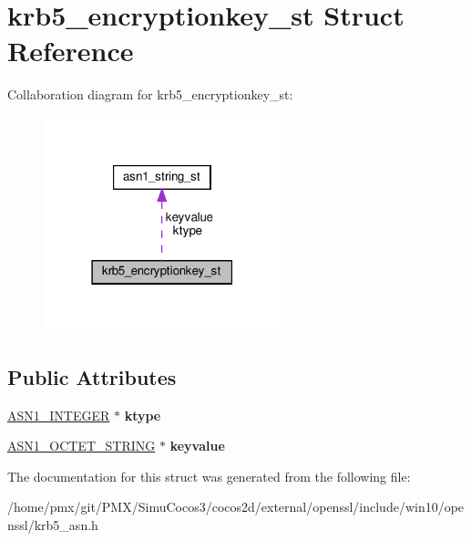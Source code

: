 \hypertarget{structkrb5__encryptionkey__st}{}\section{krb5\+\_\+encryptionkey\+\_\+st Struct Reference}
\label{structkrb5__encryptionkey__st}


Collaboration diagram for krb5\+\_\+encryptionkey\+\_\+st\+:
\nopagebreak
\begin{figure}[H]
\begin{center}
\leavevmode
\includegraphics[width=195pt]{structkrb5__encryptionkey__st__coll__graph}
\end{center}
\end{figure}
\subsection*{Public Attributes}
\begin{DoxyCompactItemize}
\item 
\mbox{\label{structkrb5__encryptionkey__st_a883042268f43cbab262213ebbb7887a9}} 
\hyperlink{structasn1__string__st}{A\+S\+N1\+\_\+\+I\+N\+T\+E\+G\+ER} $\ast$ {\bfseries ktype}
\item 
\mbox{\label{structkrb5__encryptionkey__st_a6bed28f0b8e2345d51f976c57f0ec240}} 
\hyperlink{structasn1__string__st}{A\+S\+N1\+\_\+\+O\+C\+T\+E\+T\+\_\+\+S\+T\+R\+I\+NG} $\ast$ {\bfseries keyvalue}
\end{DoxyCompactItemize}


The documentation for this struct was generated from the following file\+:\begin{DoxyCompactItemize}
\item 
/home/pmx/git/\+P\+M\+X/\+Simu\+Cocos3/cocos2d/external/openssl/include/win10/openssl/krb5\+\_\+asn.\+h\end{DoxyCompactItemize}
